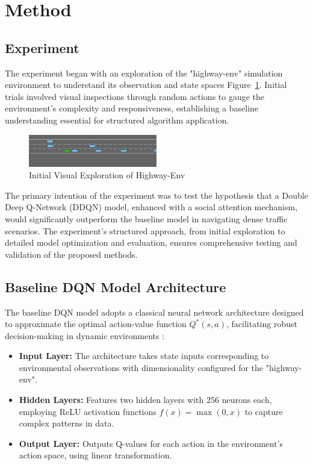 \documentclass{article}
\begin{document}
\section{Method}

\subsection{Experiment}
The experiment began with an exploration of the "highway-env" simulation environment to understand its observation and state spaces Figure~\ref{fig:initial_visual_inspection}. Initial trials involved visual inspections through random actions to gauge the environment's complexity and responsiveness, establishing a baseline understanding essential for structured algorithm application.

\begin{figure}[ht]
  \centering
  \includegraphics[width=0.5\textwidth]{./figures/highway_simulation_frame7.png}
  \caption{Initial Visual Exploration of Highway-Env}
  \label{fig:initial_visual_inspection}
\end{figure}

The primary intention of the experiment was to test the hypothesis that a Double Deep Q-Network (DDQN) model, enhanced with a social attention mechanism, would significantly outperform the baseline model in navigating dense traffic scenarios.
The experiment's structured approach, from initial exploration to detailed model optimization and evaluation, ensures comprehensive testing and validation of the proposed methods.

\subsection{Baseline DQN Model Architecture}
The baseline DQN model adopts a classical neural network architecture designed to approximate the optimal action-value function \( Q^*(s, a) \), facilitating robust decision-making in dynamic environments \citep{mnih2015humanlevel}:

\begin{itemize}
    \item \textbf{Input Layer:} The architecture takes state inputs corresponding to environmental observations with dimensionality configured for the "highway-env".
    \item \textbf{Hidden Layers:} Features two hidden layers with 256 neurons each, employing ReLU activation functions \( f(x) = \max(0, x) \) to capture complex patterns in data.
    \item \textbf{Output Layer:} Outputs Q-values for each action in the environment's action space, using linear transformation.
\end{itemize}
\end{document}

